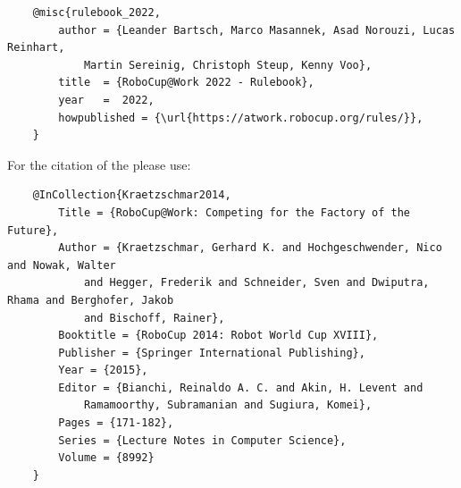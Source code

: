 \begin{titlepage}
\begin{minipage}{\textwidth}
\begin{verbatim}
	@misc{rulebook_2022,
		author = {Leander Bartsch, Marco Masannek, Asad Norouzi, Lucas Reinhart, 
			Martin Sereinig, Christoph Steup, Kenny Voo},
		title  = {RoboCup@Work 2022 - Rulebook},
		year   =  2022,
		howpublished = {\url{https://atwork.robocup.org/rules/}},
	}
\end{verbatim}


For the citation of the \RCAW please use:
\begin{verbatim}
	@InCollection{Kraetzschmar2014,
		Title = {RoboCup@Work: Competing for the Factory of the Future},
		Author = {Kraetzschmar, Gerhard K. and Hochgeschwender, Nico and Nowak, Walter
			and Hegger, Frederik and Schneider, Sven and Dwiputra, Rhama and Berghofer, Jakob
			and Bischoff, Rainer},
		Booktitle = {RoboCup 2014: Robot World Cup XVIII},
		Publisher = {Springer International Publishing},
		Year = {2015},
		Editor = {Bianchi, Reinaldo A. C. and Akin, H. Levent and
			Ramamoorthy, Subramanian and Sugiura, Komei},
		Pages = {171-182},
		Series = {Lecture Notes in Computer Science},
		Volume = {8992}
	}
\end{verbatim}
\end{minipage}




\end{titlepage}

